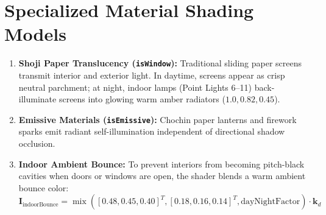 \section{Specialized Material Shading Models}
\begin{enumerate}
    \item \textbf{Shoji Paper Translucency (\texttt{isWindow}):} Traditional sliding paper screens transmit interior and exterior light. In daytime, screens appear as crisp neutral parchment; at night, indoor lamps (Point Lights 6--11) back-illuminate screens into glowing warm amber radiators ($1.0, 0.82, 0.45$).
    \item \textbf{Emissive Materials (\texttt{isEmissive}):} Chochin paper lanterns and firework sparks emit radiant self-illumination independent of directional shadow occlusion.
    \item \textbf{Indoor Ambient Bounce:} To prevent interiors from becoming pitch-black cavities when doors or windows are open, the shader blends a warm ambient bounce color:
    \begin{equation}
    \mathbf{I}_{\text{indoorBounce}} = \operatorname{mix}\left( [0.48, 0.45, 0.40]^T, [0.18, 0.16, 0.14]^T, \text{dayNightFactor} \right) \cdot \mathbf{k}_d
    \end{equation}
\end{enumerate}
